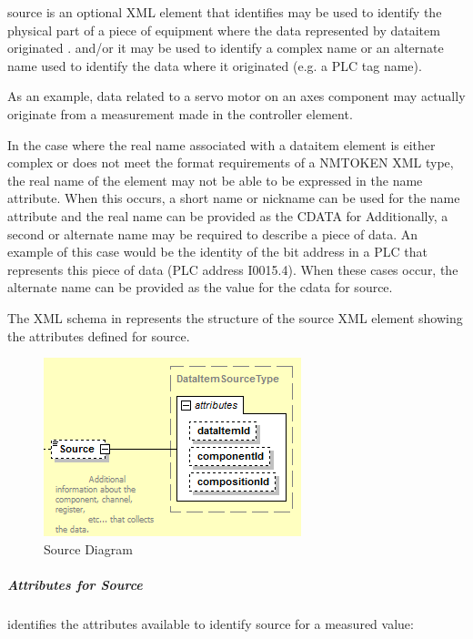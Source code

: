 \documentclass{mtconnect}	%
\providecommand{\DIFadd}[1]{{\hspace{0pt}\protect\color{blue}#1}} %
\providecommand{\DIFdel}[1]{{\hspace{0pt}\protect\color{red}#1}}                      %
\providecommand{\DIFaddbegin}{} %
\providecommand{\DIFaddend}{} %
\providecommand{\DIFdelbegin}{} %
\providecommand{\DIFdelend}{} %
\begin{document}
\gls{source} is an optional XML element that \DIFdelbegin \DIFdel{identifies }\DIFdelend \DIFaddbegin \DIFadd{may be used to identify }\DIFaddend the physical part of a piece of equipment where the data represented by \gls{dataitem} originated \DIFdelbegin \DIFdel{.
}\DIFdelend \DIFaddbegin \DIFadd{and/or it may be used to identify a complex name or an alternate name used to identify the data where it originated (e.g. a PLC tag name).
}\DIFaddend 

As an example, data related to a servo motor on an \gls{axes} component may actually originate from a measurement made in the \gls{controller} element.

In the case where the real name associated with a \gls{dataitem} element is either complex or does not meet the format requirements of a NMTOKEN XML type, the real name of the element may not be able to be expressed in the \gls{name} attribute. \DIFdelbegin \DIFdel{When this occurs, a short name or nickname can be used for the name attribute and the real name can be provided as the CDATA for} \DIFdelend \DIFaddbegin \DIFadd{Additionally, a second or alternate name may be required to describe a piece of data. An example of this case would be the identity of the bit address in a PLC that represents this piece of data (PLC address I0015.4). When these cases occur, the alternate name can be provided as the value for the \gls{cdata} for } \DIFaddend\gls{source}.

The XML schema in  represents the structure of the \gls{source} XML element showing the attributes defined for \gls{source}.

\begin{figure}[ht]
  \centering
  \includegraphics[width=.5\textwidth]{figures/source-schema-diagram.png}
  \caption{Source Diagram}
  \label{fig:source-schema-diagram}
\end{figure}
\FloatBarrier

\subparagraph{Attributes for Source} \mbox{}

 identifies the attributes available to identify \gls{source} for a measured value:
\end{document}
